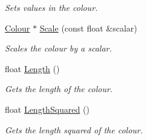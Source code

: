 \begin{DoxyCompactItemize}
\begin{DoxyCompactList}\small\item\em Sets values in the colour. \end{DoxyCompactList}\item 
\hyperlink{class_flounder_1_1_colour}{Colour} $\ast$ \hyperlink{class_flounder_1_1_colour_a8747c13978f052dfcab3ded7dd26c26b}{Scale} (const float \&scalar)
\begin{DoxyCompactList}\small\item\em Scales the colour by a scalar. \end{DoxyCompactList}\item 
float \hyperlink{class_flounder_1_1_colour_a42c4eb61e3eb6b9ae29fde11e4428f9d}{Length} ()
\begin{DoxyCompactList}\small\item\em Gets the length of the colour. \end{DoxyCompactList}\item 
float \hyperlink{class_flounder_1_1_colour_a4bc77aaec8c0018d8fd210558bc5728a}{Length\+Squared} ()
\begin{DoxyCompactList}\small\item\em Gets the length squared of the colour. \end{DoxyCompactList}\end{DoxyCompactItemize}
